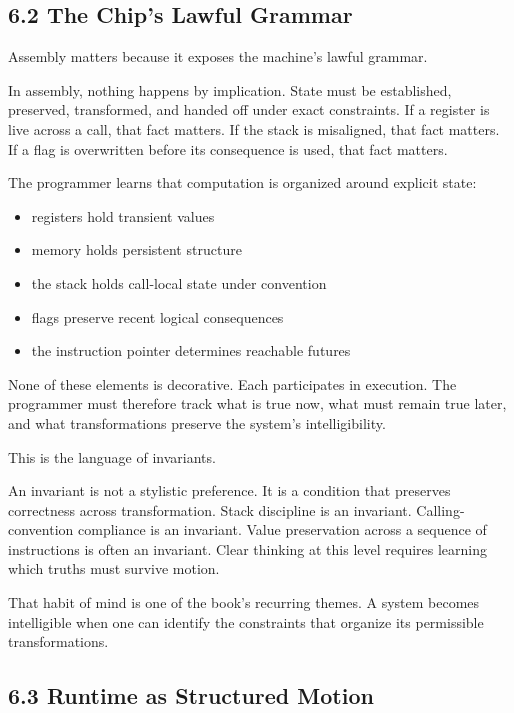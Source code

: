 \documentclass[
]{article}
\providecommand{\tightlist}{%
  \setlength{\itemsep}{0pt}\setlength{\parskip}{0pt}}
\begin{document}
\hypertarget{the-chips-lawful-grammar}{%
\subsection{6.2 The Chip's Lawful
Grammar}\label{the-chips-lawful-grammar}}

Assembly matters because it exposes the machine's lawful grammar.

In assembly, nothing happens by implication. State must be established,
preserved, transformed, and handed off under exact constraints. If a
register is live across a call, that fact matters. If the stack is
misaligned, that fact matters. If a flag is overwritten before its
consequence is used, that fact matters.

The programmer learns that computation is organized around explicit
state:

\begin{itemize}
\tightlist
\item
  registers hold transient values
\item
  memory holds persistent structure
\item
  the stack holds call-local state under convention
\item
  flags preserve recent logical consequences
\item
  the instruction pointer determines reachable futures
\end{itemize}

None of these elements is decorative. Each participates in execution.
The programmer must therefore track what is true now, what must remain
true later, and what transformations preserve the system's
intelligibility.

This is the language of invariants.

An invariant is not a stylistic preference. It is a condition that
preserves correctness across transformation. Stack discipline is an
invariant. Calling-convention compliance is an invariant. Value
preservation across a sequence of instructions is often an invariant.
Clear thinking at this level requires learning which truths must survive
motion.

That habit of mind is one of the book's recurring themes. A system
becomes intelligible when one can identify the constraints that organize
its permissible transformations.

\hypertarget{runtime-as-structured-motion}{%
\subsection{6.3 Runtime as Structured
Motion}\label{runtime-as-structured-motion}}
\end{document}
